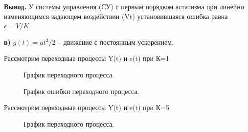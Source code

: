 \documentclass[a4paper, 11pt]{article}
\begin{document}
\normalsize{\textbf{Вывод.} У системы управления (СУ) с первым порядком астатизма при линейно изменяющимся задающем воздействии (Vt) установившаяся ошибка равна $\epsilon=V/K$}

\hfill \break
\normalsize{\textbf{в)} $g(t)=at^2/2$ – движение с постоянным ускорением.

Рассмотрим переходные процессы Y(t) и e(t) при К=1}


\begin{figure}[h]
    \caption{График переходного процесса.}
    \label{two}
\end{figure}

\begin{figure}[h]
    \caption{График ошибки переходного процесса.}
    \label{tree}
\end{figure}

\newpage

\normalsize{Рассмотрим переходные процессы Y(t) и e(t) при К=5}

\begin{figure}[h]
    \caption{График переходного процесса.}
    \label{two}
\end{figure}
\end{document}

